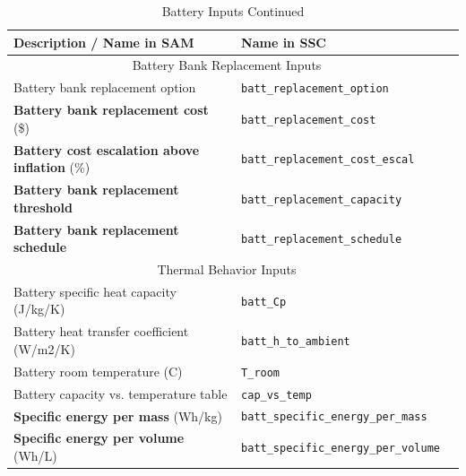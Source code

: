 \documentclass[12pt,letterpaper]{article}
\begin{document}
\begin{table}
\begin{center}
\caption{Battery Inputs Continued}
\begin{tabular}{lll}
\midrule
Description / \textbf{Name in SAM} & Name in SSC \\
\midrule
\multicolumn{2}{c}{Battery Bank Replacement Inputs}\\
Battery bank replacement option & \texttt{batt\_replacement\_option} \\
\textbf{Battery bank replacement cost} (\$) & \texttt{batt\_replacement\_cost} \\
\textbf{Battery cost escalation above inflation} (\%) & \texttt{batt\_replacement\_cost\_escal} \\
\textbf{Battery bank replacement threshold} & \texttt{batt\_replacement\_capacity} \\
\textbf{Battery bank replacement schedule} & \texttt{batt\_replacement\_schedule} \\

\midrule
\multicolumn{2}{c}{Thermal Behavior Inputs}\\
Battery specific heat capacity (J/kg/K) & \texttt{batt\_Cp} \\
Battery heat transfer coefficient (W/m2/K)& \texttt{batt\_h\_to\_ambient} \\
Battery room temperature (C) & \texttt{T\_room} \\
Battery capacity vs. temperature table & \texttt{cap\_vs\_temp} \\
\textbf{Specific energy per mass} (Wh/kg) & \texttt{batt\_specific\_energy\_per\_mass} \\
\textbf{Specific energy per volume} (Wh/L) & \texttt{batt\_specific\_energy\_per\_volume} \\
\hline
\end{tabular}
\label{tab-batteryinputs2}
\end{center}
\end{table}
\end{document}

